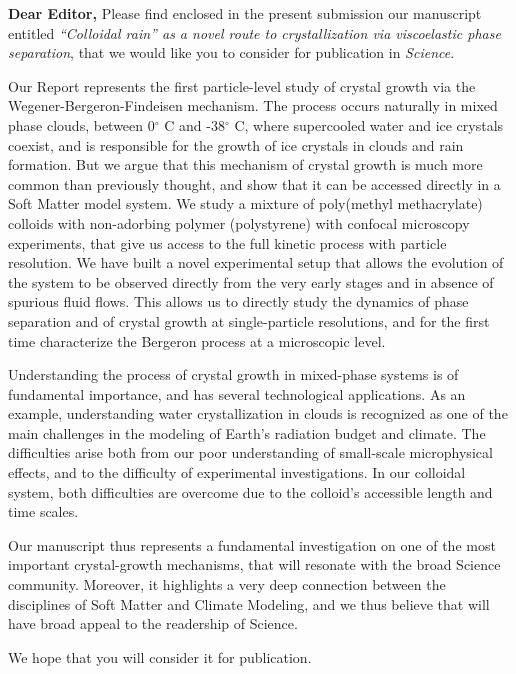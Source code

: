 \documentclass[11pt]{article}
\begin{document}
\doublespacing

\noindent
{\bf Dear Editor,}
\vskip 0.3cm
Please find enclosed in the present submission our manuscript entitled
\emph{``Colloidal rain'' as a novel route to crystallization via viscoelastic phase separation},
that we would like you to consider for publication in \emph{Science}.

Our Report represents the first particle-level study of crystal growth via the Wegener-Bergeron-Findeisen mechanism.
The process occurs naturally in mixed phase clouds, between 0$^\circ$ C and -38$^\circ$ C, where supercooled water and ice crystals coexist,
and is responsible for the growth of ice crystals in clouds and rain formation. But we argue that this
mechanism of crystal growth is much more common than previously thought,
and show that it can be accessed directly in a Soft Matter model system.
We study a mixture of poly(methyl methacrylate) colloids with non-adorbing polymer (polystyrene)
with confocal microscopy experiments, that give us access to the full kinetic process with
particle resolution. We have built a novel experimental setup that allows the evolution of
the system to be observed directly from the very early stages and in absence of spurious fluid flows.
This allows us to directly study the dynamics of phase separation and of crystal growth at single-particle resolutions,
and for the first time characterize the Bergeron process at a microscopic level.

Understanding the process of crystal growth in mixed-phase systems is of fundamental importance,
and has several technological applications. As an example, understanding
water crystallization in clouds is recognized as one of the main challenges in the
modeling of Earth's radiation budget and climate. The difficulties arise both from our poor understanding of small-scale microphysical effects,
and to the difficulty of experimental investigations. In our colloidal system, both
difficulties are overcome due to the colloid's accessible length and time scales.

Our manuscript thus represents a fundamental investigation on one of the most important
crystal-growth mechanisms, that will resonate with the broad Science community.
Moreover, it highlights a very deep connection between the disciplines of Soft Matter and Climate Modeling,
and we thus believe that will have broad appeal to the readership of Science.

We hope that you will consider it for publication.
\end{document}
